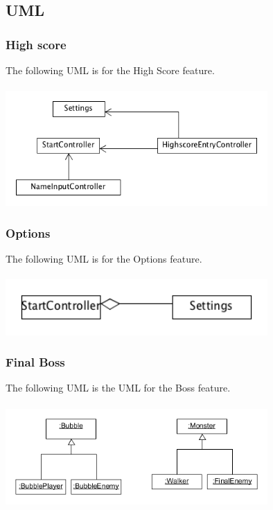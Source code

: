 \subsection{UML}

\subsubsection{High score}

The following UML is for the High Score feature.
\\\\
\includegraphics[width=100mm]{HighscoreUML.png}

\subsubsection{Options}
The following UML is for the Options feature.
\\\\
\includegraphics[width=100mm]{Options_UML.png}

\subsubsection{Final Boss}

The following UML is the UML for the Boss feature.
\\\\
\includegraphics[width=100mm]{FinalEnemyUml.png}



